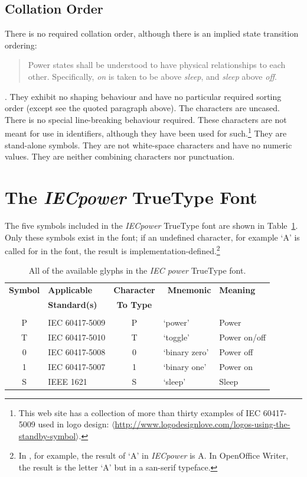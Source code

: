 \documentclass[10pt,a4paper]{article}
\newcommand{\URL}[1]{$\langle$\url{#1}$\rangle$}
\newcommand{\IEC}[1]{{\fontspec{IECpower}#1}}
\begin{document}
\subsection{Collation Order}\label{section:collation-order}

There is no required collation order, although there is an implied state transition
ordering:

\begin{quote}
Power states shall be understood to have physical relationships to each other.
Specifically, \emph{on} is taken to be above \emph{sleep}, and \emph{sleep} above
\emph{off}.
\end{quote}

\noindent \cite[\S 4.4, emphasis in original]{IEEE1621}. They exhibit no shaping
behaviour and have no particular required sorting order (except see the quoted
paragraph above). The characters are uncased. There is no special line-breaking
behaviour required. These characters are not meant for use in identifiers,
although they have been used for such.\footnote{This web site has a collection
of more than thirty examples of IEC 60417-5009 used in logo design:
\URL{http://www.logodesignlove.com/logos-using-the-standby-symbol}.} They are
stand-alone symbols.  They are not white-space characters and have no numeric
values. They are neither combining characters nor punctuation.

\section{The \emph{IECpower} TrueType Font}

The five symbols included in the \emph{IECpower} TrueType font are shown in
Table~\ref{table:symbols}. Only these symbols exist in the font; if an undefined
character, for example `A' is called for in the font, the result is
implementation-defined.\footnote{In , for example, the result of
`A' in \emph{IECpower} is \IEC{A}.  In OpenOffice Writer, the result is the
letter `A' but in a san-serif typeface.}

\begin{table}[htbp]
	\centering
	\begin{tabular}{clcll}
		\textbf{Symbol} & \textbf{Applicable} & \textbf{Character} & \
			\textbf{Mnemonic} & \textbf{Meaning} \\
		& \textbf{Standard(s)} & \textbf{To Type} \\
		\hline \\
		\IEC{P} & IEC 60417-5009 & P & `power'       & Power        \\
		\IEC{T} & IEC 60417-5010 & T & `toggle'      & Power on/off \\
		\IEC{0} & IEC 60417-5008 & 0 & `binary zero' & Power off    \\
		\IEC{1} & IEC 60417-5007 & 1 & `binary one'  & Power on     \\
		\IEC{S} & IEEE 1621      & S & `sleep'       & Sleep        \\
    \end{tabular}
    \caption{All of the available glyphs in the \emph{IEC power} TrueType font.}
    \label{table:symbols} %
\end{table}
\end{document}

